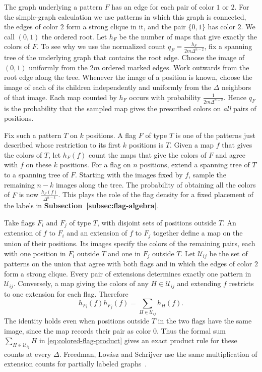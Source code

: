 The graph underlying a pattern $F$ has an edge for each pair of
color $1$ or $2$. For the simple-graph calculation we use patterns
in which this graph is connected, the edges of color $2$ form a strong
clique in it, and the pair $\{0,1\}$ has color $2$. We call $(0,1)$
the ordered root. Let $h_F$ be the number of maps that give exactly
the colors of $F$. To see why we use the normalized count
$q_F=\frac{h_F}{2m\Delta^{n-2}}$, fix a spanning tree of the underlying
graph that contains the root edge. Choose the image of $(0,1)$
uniformly from the $2m$ ordered marked edges. Work outwards from the
root edge along the tree. Whenever the image of a position is known,
choose the image of each of its children independently and uniformly
from the $\Delta$ neighbors of that image. Each map counted by $h_F$
occurs with probability $\frac{1}{2m\Delta^{n-2}}$. Hence $q_F$ is the
probability that the sampled map gives the prescribed colors on
\emph{all} pairs of positions.

Fix such a pattern $T$ on $k$ positions. A flag $F$ of type $T$
is one of the patterns just described whose restriction to its first
$k$ positions is $T$. Given a map $f$ that gives the colors of $T$,
let $h_F(f)$ count the maps that give the colors of $F$ and agree
with $f$ on these $k$ positions. For a flag on $n$ positions, extend
a spanning tree of $T$ to a spanning tree of $F$. Starting with the
images fixed by $f$, sample the remaining $n-k$ images along the
tree. The probability of obtaining all the colors of $F$ is now
$\frac{h_F(f)}{\Delta^{n-k}}$. This plays the role of the flag
density for a fixed placement of the labels in
\textbf{Subsection~\ref{subsec:flag-algebra}}.

Take flags $F_i$ and $F_j$ of type $T$, with disjoint sets of positions
outside $T$. An extension of $f$ to $F_i$ and an extension of $f$ to
$F_j$ together define a map on the union of their positions. Its images
specify the colors of the remaining pairs, each with one position
in $F_i$ outside $T$ and one in $F_j$ outside $T$. Let
$\mathcal U_{ij}$ be the set of patterns on the union that agree with
both flags and in which the edges of color $2$ form a strong clique.
Every pair of extensions determines exactly one pattern in
$\mathcal U_{ij}$. Conversely, a map giving the colors of any
$H\in\mathcal U_{ij}$ and extending $f$ restricts to one extension
for each flag. Therefore
\[
 h_{F_i}(f)h_{F_j}(f)=\sum_{H\in\mathcal U_{ij}}h_H(f).
\]
The identity holds even when positions outside $T$ in the two flags
have the same image, since the map records their pair as color $0$.
Thus the formal sum $\sum_{H\in\mathcal U_{ij}}H$ in
\eqref{eq:colored-flag-product} gives an exact product rule for these
counts at every $\Delta$. Freedman, Lov\'asz and Schrijver use the
same multiplication of extension counts for partially labeled
graphs~\cite{FreedmanLovaszSchrijver2007}.

